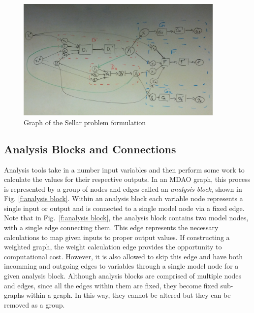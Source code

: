 \begin{figure}[htb!]
    \begin{center}
    \includegraphics[width=4in]{images/sellar_graph_full}
    \end{center}
    \vspace{-10pt}
\caption{Graph of the Sellar problem formulation}
\label{f:sellar_graph_full}
\end{figure}

\subsection{Analysis Blocks and Connections}
\label{ss:analysis blocks and connections}
Analysis tools take in a number input variables and then perform some work to calculate 
the values for their respective outputs. In an MDAO graph, this process is 
represented by a group of nodes and edges called an \emph{analysis block}, 
shown in Fig. \ref{f:analysis block}. Within an analysis block each variable 
node represents a single input or output and is connected 
to a single model node via a fixed edge. Note that in Fig.~\ref{f:analysis block}, 
the analysis block contains two model nodes, with a single edge connecting them. 
This edge represents the necessary calculations to map given inputs 
to proper output values. If constructing a weighted graph, the weight calculation edge 
provides the opportunity to computational cost. However, it is also allowed to 
skip this edge and have both incomming and outgoing edges to variables through a 
single model node for a given analysis block. Although analysis blocks are 
comprised of multiple nodes and edges, since all the edges within them are 
fixed, they become fixed sub-graphs within a graph. In this way, they cannot be 
altered but they can be removed as a group.


